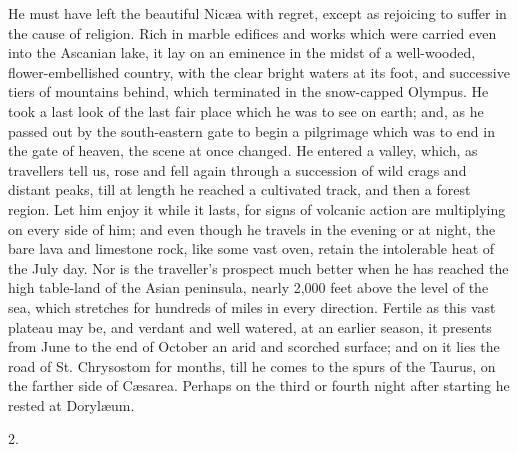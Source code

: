 He must have left the beautiful Nicæa with regret, except as
rejoicing to suffer in the cause of religion. Rich in marble edifices
and works which were carried even into the Ascanian lake, it lay on an
eminence in the midst of a well-wooded, flower-embellished country,
with the clear bright waters at its foot, and successive tiers of
mountains behind, which terminated in the snow-capped Olympus. He took
a last look of the last fair place which he was to see on earth; and,
as he passed out by the south-eastern gate to begin a pilgrimage which
was to end in the gate of heaven, the scene at once changed. He
entered a valley, which, as travellers tell us, rose and fell again
through a succession of wild crags and distant peaks, till at length
he reached a cultivated track, and then a forest region. Let him enjoy
it while it lasts, for signs of volcanic action are multiplying on
every side of him; and even though he travels in the evening or at
night, the bare lava and limestone rock, like some vast oven,
retain the intolerable heat of the July day. Nor is the traveller's
prospect much better when he has reached the high table-land of the
Asian peninsula, nearly 2,000 feet above the level of the sea, which
stretches for hundreds of miles in every direction. Fertile as this
vast plateau may be, and verdant and well watered, at an earlier
season, it presents from June to the end of October an arid and
scorched surface; and on it lies the road of St. Chrysostom for
months, till he comes to the spurs of the Taurus, on the farther side
of Cæsarea. Perhaps on the third or fourth night after starting he
rested at Dorylæum.

2.

